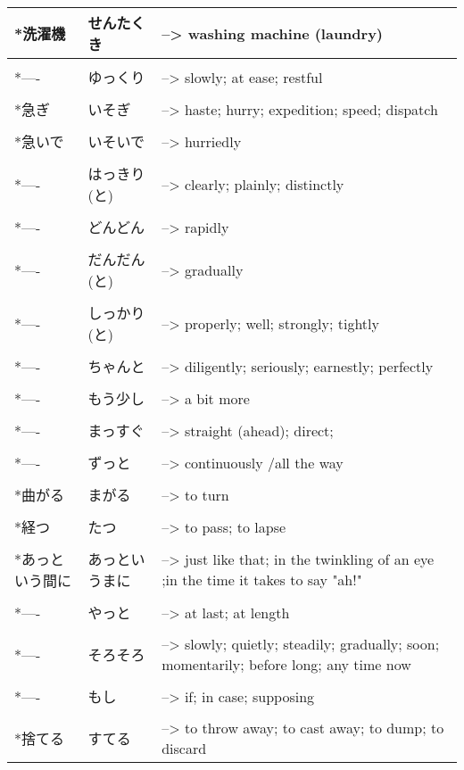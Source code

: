 \documentclass{article}
\begin{document}
\begin{tabular}{ l | l p{13cm} }
*洗濯機&せんたくき&--> washing machine (laundry) \\ \hline\\[-1em]
*----&ゆっくり&--> slowly; at ease; restful \\ \hline\\[-1em]
*急ぎ&いそぎ&--> haste; hurry; expedition; speed; dispatch \\ \hline\\[-1em]
*急いで&いそいで&--> hurriedly \\ \hline\\[-1em]
*----&はっきり(と)&--> clearly; plainly; distinctly \\ \hline\\[-1em]
*----&どんどん&--> rapidly \\ \hline\\[-1em]
*----&だんだん(と)&--> gradually \\ \hline\\[-1em]
*----&しっかり(と)&--> properly; well; strongly; tightly \\ \hline\\[-1em]
*----&ちゃんと&--> diligently; seriously; earnestly; perfectly \\ \hline\\[-1em]
*----&もう少し&--> a bit more \\ \hline\\[-1em]
*----&まっすぐ&--> straight (ahead); direct; \\ \hline\\[-1em]
*----&ずっと&--> continuously /all the way \\ \hline\\[-1em]
*曲がる&まがる&--> to turn \\ \hline\\[-1em]
*経つ&たつ&--> to pass; to lapse \\ \hline\\[-1em]
*あっという間に&あっというまに&--> just like that; in the twinkling of an eye ;in the time it takes to say "ah!" \\ \hline\\[-1em]
*----&やっと&--> at last; at length \\ \hline\\[-1em]
*----&そろそろ&--> slowly; quietly; steadily; gradually; soon; momentarily; before long; any time now \\ \hline\\[-1em]
*----&もし&--> if; in case; supposing \\ \hline\\[-1em]
*捨てる&すてる&--> to throw away; to cast away; to dump; to discard
\end{tabular}
\end{document}
